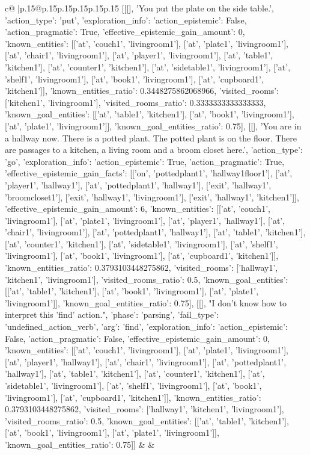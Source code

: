 \documentclass{article}
\begin{document}
{\begin{supertabular}{c@{$\;$}|p{.15\linewidth}@{}p{.15\linewidth}p{.15\linewidth}p{.15\linewidth}p{.15\linewidth}p{.15\linewidth}}
{{{	 [[[], 'You put the plate on the side table.', {'action_type': 'put', 'exploration_info': {'action_epistemic': False, 'action_pragmatic': True, 'effective_epistemic_gain_amount': 0, 'known_entities': [['at', 'couch1', 'livingroom1'], ['at', 'plate1', 'livingroom1'], ['at', 'chair1', 'livingroom1'], ['at', 'player1', 'livingroom1'], ['at', 'table1', 'kitchen1'], ['at', 'counter1', 'kitchen1'], ['at', 'sidetable1', 'livingroom1'], ['at', 'shelf1', 'livingroom1'], ['at', 'book1', 'livingroom1'], ['at', 'cupboard1', 'kitchen1']], 'known_entities_ratio': 0.3448275862068966, 'visited_rooms': ['kitchen1', 'livingroom1'], 'visited_rooms_ratio': 0.3333333333333333, 'known_goal_entities': [['at', 'table1', 'kitchen1'], ['at', 'book1', 'livingroom1'], ['at', 'plate1', 'livingroom1']], 'known_goal_entities_ratio': 0.75}}], [[], 'You are in a hallway now. There is a potted plant. The potted plant is on the floor. There are passages to a kitchen, a living room and a broom closet here.', {'action_type': 'go', 'exploration_info': {'action_epistemic': True, 'action_pragmatic': True, 'effective_epistemic_gain_facts': [['on', 'pottedplant1', 'hallway1floor1'], ['at', 'player1', 'hallway1'], ['at', 'pottedplant1', 'hallway1'], ['exit', 'hallway1', 'broomcloset1'], ['exit', 'hallway1', 'livingroom1'], ['exit', 'hallway1', 'kitchen1']], 'effective_epistemic_gain_amount': 6, 'known_entities': [['at', 'couch1', 'livingroom1'], ['at', 'plate1', 'livingroom1'], ['at', 'player1', 'hallway1'], ['at', 'chair1', 'livingroom1'], ['at', 'pottedplant1', 'hallway1'], ['at', 'table1', 'kitchen1'], ['at', 'counter1', 'kitchen1'], ['at', 'sidetable1', 'livingroom1'], ['at', 'shelf1', 'livingroom1'], ['at', 'book1', 'livingroom1'], ['at', 'cupboard1', 'kitchen1']], 'known_entities_ratio': 0.3793103448275862, 'visited_rooms': ['hallway1', 'kitchen1', 'livingroom1'], 'visited_rooms_ratio': 0.5, 'known_goal_entities': [['at', 'table1', 'kitchen1'], ['at', 'book1', 'livingroom1'], ['at', 'plate1', 'livingroom1']], 'known_goal_entities_ratio': 0.75}}], [[], "I don't know how to interpret this 'find' action.", {'phase': 'parsing', 'fail_type': 'undefined_action_verb', 'arg': 'find', 'exploration_info': {'action_epistemic': False, 'action_pragmatic': False, 'effective_epistemic_gain_amount': 0, 'known_entities': [['at', 'couch1', 'livingroom1'], ['at', 'plate1', 'livingroom1'], ['at', 'player1', 'hallway1'], ['at', 'chair1', 'livingroom1'], ['at', 'pottedplant1', 'hallway1'], ['at', 'table1', 'kitchen1'], ['at', 'counter1', 'kitchen1'], ['at', 'sidetable1', 'livingroom1'], ['at', 'shelf1', 'livingroom1'], ['at', 'book1', 'livingroom1'], ['at', 'cupboard1', 'kitchen1']], 'known_entities_ratio': 0.3793103448275862, 'visited_rooms': ['hallway1', 'kitchen1', 'livingroom1'], 'visited_rooms_ratio': 0.5, 'known_goal_entities': [['at', 'table1', 'kitchen1'], ['at', 'book1', 'livingroom1'], ['at', 'plate1', 'livingroom1']], 'known_goal_entities_ratio': 0.75}}]] 
	  } 
	   } 
	   } 
	 & & \\ 
 


\end{supertabular}}
\end{document}
